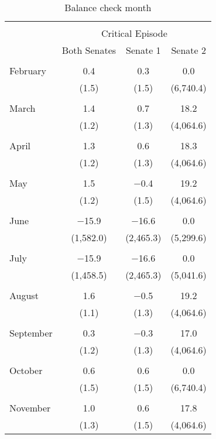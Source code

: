 
\begin{table}[!htbp] \centering 
  \caption{Balance check month} 
  \label{} 
\begin{tabular}{@{\extracolsep{5pt}}lccc} 
\\[-1.8ex]\hline 
\hline \\[-1.8ex] 
 & \multicolumn{3}{c}{Critical Episode} \\ 
\cline{2-4} 
 & Both Senates & Senate 1 & Senate 2 \\ 
\hline \\[-1.8ex] 
 February & 0.4 & 0.3 & 0.0 \\ 
  & (1.5) & (1.5) & (6,740.4) \\ 
  & & & \\ 
 March & 1.4 & 0.7 & 18.2 \\ 
  & (1.2) & (1.3) & (4,064.6) \\ 
  & & & \\ 
 April & 1.3 & 0.6 & 18.3 \\ 
  & (1.2) & (1.3) & (4,064.6) \\ 
  & & & \\ 
 May & 1.5 & $-$0.4 & 19.2 \\ 
  & (1.2) & (1.5) & (4,064.6) \\ 
  & & & \\ 
 June & $-$15.9 & $-$16.6 & 0.0 \\ 
  & (1,582.0) & (2,465.3) & (5,299.6) \\ 
  & & & \\ 
 July & $-$15.9 & $-$16.6 & 0.0 \\ 
  & (1,458.5) & (2,465.3) & (5,041.6) \\ 
  & & & \\ 
 August & 1.6 & $-$0.5 & 19.2 \\ 
  & (1.1) & (1.3) & (4,064.6) \\ 
  & & & \\ 
 September & 0.3 & $-$0.3 & 17.0 \\ 
  & (1.2) & (1.3) & (4,064.6) \\ 
  & & & \\ 
 October & 0.6 & 0.6 & 0.0 \\ 
  & (1.5) & (1.5) & (6,740.4) \\ 
  & & & \\ 
 November & 1.0 & 0.6 & 17.8 \\ 
  & (1.3) & (1.5) & (4,064.6) \\ 

\end{tabular}
\end{table}
